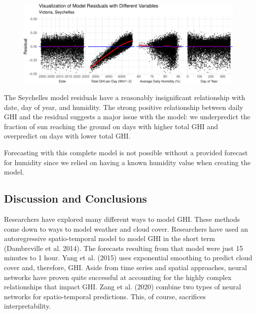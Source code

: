 \documentclass[
  letterpaper,
  DIV=11,
  numbers=noendperiod]{scrartcl}
\begin{document}
\begin{figure}

{\centering \includegraphics{FinalReport_files/figure-pdf/unnamed-chunk-14-1.pdf}

}

\end{figure}

The Seychelles model residuals have a reasonably insignificant
relationship with date, day of year, and humidity. The strong positive
relationship between daily GHI and the residual suggests a major issue
with the model: we underpredict the fraction of sun reaching the ground
on days with higher total GHI and overpredict on days with lower total
GHI.

Forecasting with this complete model is not possible without a provided
forecast for humidity since we relied on having a known humidity value
when creating the model.

\hypertarget{discussion-and-conclusions}{%
\subsection{Discussion and
Conclusions}\label{discussion-and-conclusions}}

Researchers have explored many different ways to model GHI. These
methods come down to ways to model weather and cloud cover. Researchers
have used an autoregressive spatio-temporal model to model GHI in the
short term (Dambreville et al. 2014). The forecasts resulting from that
model were just 15 minutes to 1 hour. Yang et al. (2015) uses
exponential smoothing to predict cloud cover and, therefore, GHI. Aside
from time series and spatial approaches, neural networks have proven
quite successful at accounting for the highly complex relationships that
impact GHI. Zang et al. (2020) combine two types of neural networks for
spatio-temporal predictions. This, of course, sacrifices
interpretability.
\end{document}
